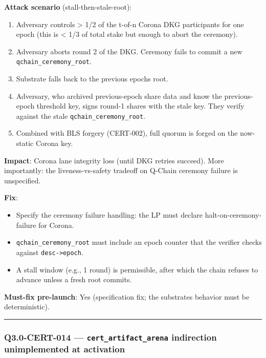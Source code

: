 \documentclass[
]{article}
\providecommand{\tightlist}{%
  \setlength{\itemsep}{0pt}\setlength{\parskip}{0pt}}
\begin{document}
\textbf{Attack scenario} (stall-then-stale-root):

\begin{enumerate}
\def\labelenumi{\arabic{enumi}.}
\tightlist
\item
  Adversary controls \textgreater{} 1/2 of the t-of-n Corona DKG
  participants for one epoch (this is \textless{} 1/3 of total stake but
  enough to abort the ceremony).
\item
  Adversary aborts round 2 of the DKG. Ceremony fails to commit a new
  \texttt{qchain\_ceremony\_root}.
\item
  Substrate falls back to the previous epoch\textquotesingle s root.
\item
  Adversary, who archived previous-epoch share data and know the
  previous-epoch threshold key, signs round-1 shares with the stale key.
  They verify against the stale \texttt{qchain\_ceremony\_root}.
\item
  Combined with BLS forgery (CERT-002), full quorum is forged on the
  now-static Corona key.
\end{enumerate}

\textbf{Impact}: Corona lane integrity loss (until DKG retries
succeed). More importantly: the liveness-vs-safety tradeoff on Q-Chain
ceremony failure is unspecified.

\textbf{Fix}:

\begin{itemize}
\tightlist
\item
  Specify the ceremony failure handling: the LP must declare
  halt-on-ceremony-failure for Corona.
\item
  \texttt{qchain\_ceremony\_root} must include an epoch counter that the
  verifier checks against \texttt{desc-\textgreater{}epoch}.
\item
  A stall window (e.g., 1 round) is permissible, after which the chain
  refuses to advance unless a fresh root commits.
\end{itemize}

\textbf{Must-fix pre-launch}: Yes (specification fix; the
substrate\textquotesingle s behavior must be deterministic).

\begin{center}\rule{0.5\linewidth}{0.5pt}\end{center}

\subsubsection{\texorpdfstring{Q3.0-CERT-014 ---
\texttt{cert\_artifact\_arena} indirection unimplemented at
activation}{Q3.0-CERT-014 --- cert\_artifact\_arena indirection unimplemented at activation}}\label{q30-cert-014--cert_artifact_arena-indirection-unimplemented-at-activation}
\end{document}
